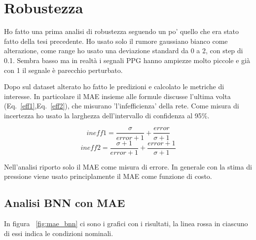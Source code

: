 \documentclass[
	letterpaper,
	a4paper,
	cleardoublepage=empty,
	headings=twolinechapter,
	numbers=autoenddot,
]{article}
\newcommand{\Eq}[0]{Eq.}
\begin{document}
	
	\section{Robustezza}
	Ho fatto una prima analisi di robustezza seguendo un po' quello che era stato fatto della tesi precedente. Ho usato solo il rumore gaussiano bianco come alterazione, come range ho usato una deviazione standard da 0 a 2, con step di 0.1. Sembra basso ma in realtà i segnali PPG hanno ampiezze molto piccole e già con 1 il segnale è parecchio perturbato.
	
	Dopo sul dataset alterato ho fatto le predizioni e calcolato le metriche di interesse. In particolare il MAE insieme alle formule discusse l'ultima volta (\Eq~\ref{eff1},\Eq~\ref{eff2}), che misurano 'l'infefficienza' della rete. Come misura di incertezza ho usato la larghezza dell'intervallo di confidenza al 95\%.
	
	\begin{equation}
		\label{eff1}
		ineff1 = \frac{\sigma}{error + 1} + \frac{error}{\sigma + 1}
	\end{equation}
	\begin{equation}
		\label{eff2}
		ineff2 = \frac{\sigma + 1}{error + 1} + \frac{error + 1}{\sigma + 1}
	\end{equation}
	
	Nell'analisi riporto solo il MAE come misura di errore. In generale con la stima di pressione viene usato principlamente il MAE come funzione di costo.
	
	\subsection{Analisi BNN con MAE}
	In figura ~\ref{fig:mae_bnn} ci sono i grafici con i risultati, la linea rossa in ciascuno di essi indica le condizioni nominali.
	
\end{document}
